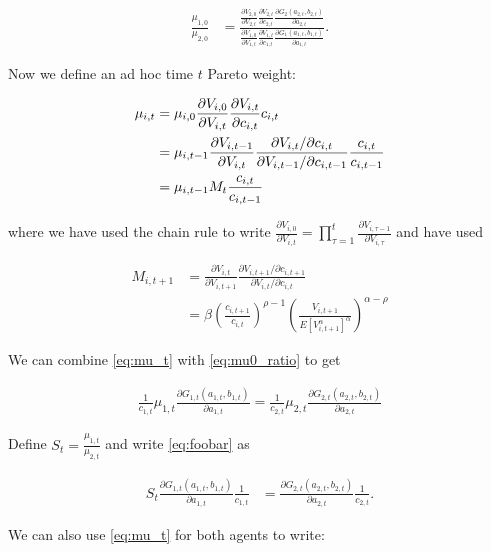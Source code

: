 \documentclass[10pt]{article}
\newcommand{\fracpd}[2]{
  \ensuremath{\frac{\partial #1}{\partial #2}}
}
\begin{document}
\begin{align} \label{eq:mu0_ratio}
  \frac{\mu_{1,0}}{\mu_{2,0}} &= \frac{\fracpd{V_{2,0}}{V_{2,t}} \fracpd{V_{2,t}}{c_{2,t}} \fracpd{G_2(a_{2,t}, b_{2,t})}{a_{2,t}}}{\fracpd{V_{1,0}}{V_{1,t}} \fracpd{V_{1,t}}{c_{1,t}} \fracpd{G_1(a_{1,t}, b_{1,t})}{a_{1,t}}}.
\end{align}

Now we define an ad hoc time $t$ Pareto weight:

\begin{align} \label{eq:mu_t}
  \mu_{i,t} &= \mu_{i,0} \fracpd{V_{i,0}}{V_{i,t}} \fracpd{V_{i,t}}{c_{i,t}} c_{i,t} \notag \\
  &= \mu_{i,t-1} \fracpd{V_{i,t-1}}{V_{i,t}} \frac{\partial V_{i,t}/ \partial c_{i,t}}{\partial V_{i,t-1}/ \partial c_{i,t-1}} \frac{c_{i,t}}{c_{i,t-1}} \\
  &= \mu_{i,t-1} M_t \frac{c_{i,t}}{c_{i,t-1}}
\end{align}

where we have used the chain rule to write $\fracpd{V_{i,0}}{V_{i,t}} = \prod_{\tau=1}^{t} \fracpd{V_{i,\tau-1}}{V_{i,\tau}}$ and have used

\begin{align} \label{eq:MRS}
  M_{i,t+1} &= \fracpd{V_{i,t}}{V_{i,t+1}} \frac{\partial V_{i,t+1}/ \partial c_{i,t+1}}{\partial V_{i,t}/ \partial c_{i,t}} \\
  &= \beta \left( \frac{c_{i,t+1}}{c_{i,t}}\right)^{\rho - 1} \left( \frac{V_{i,t+1}}{E \left[ V_{i,t+1}^{\alpha} \right]^{\alpha}} \right)^{\alpha - \rho}
\end{align}

We can combine \eqref{eq:mu_t} with \eqref{eq:mu0_ratio} to get

\begin{align} \label{eq:foobar}
  \frac{1}{c_{1,t}} \mu_{1,t} \fracpd{G_{1,t}(a_{1,t}, b_{1,t})}{a_{1,t}} = \frac{1}{c_{2,t}} \mu_{2,t} \fracpd{G_{2,t}(a_{2,t}, b_{2,t})}{a_{2,t}}
\end{align}

Define $S_t = \frac{\mu_{1,t}}{\mu_{2,t}}$ and write \eqref{eq:foobar} as

\begin{align} \label{eq:a_allocation}
  S_t \fracpd{G_{1,t}(a_{1,t}, b_{1,t})}{a_{1,t}} \frac{1}{c_{1,t}} &= \fracpd{G_{2,t}(a_{2,t}, b_{2,t})}{a_{2,t}} \frac{1}{c_{2,t}}.
\end{align}

We can also use \eqref{eq:mu_t} for both agents to write:
\end{document}
